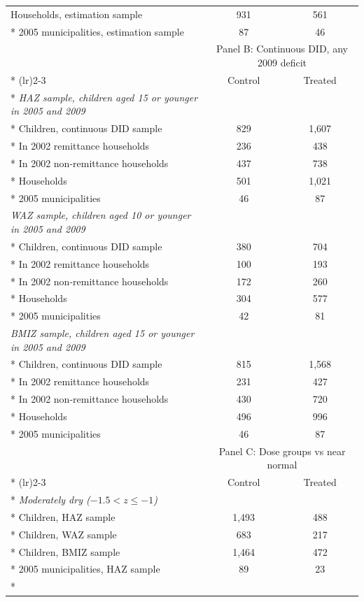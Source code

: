 \documentclass[12pt]{article}
\begin{document}
\begin{longtable}{@{\extracolsep{\fill}}lcc}
Households, estimation sample & 931 & 561\\*
2005 municipalities, estimation sample & 87 & 46\\
\bottomrule
\addlinespace[12pt]
\toprule
 & \multicolumn{2}{c}{Panel B: Continuous DID, any 2009 deficit}\\*
\cmidrule(lr){2-3}
 & Control & Treated\\*
\midrule
\textit{HAZ sample, children aged 15 or younger in 2005 and 2009} & & \\*
Children, continuous DID sample & 829 & 1,607\\*
\quad In 2002 remittance households & 236 & 438\\*
\quad In 2002 non-remittance households & 437 & 738\\*
Households & 501 & 1,021\\*
2005 municipalities & 46 & 87\\
\addlinespace[6pt]\textit{WAZ sample, children aged 10 or younger in 2005 and 2009} & & \\*
Children, continuous DID sample & 380 & 704\\*
\quad In 2002 remittance households & 100 & 193\\*
\quad In 2002 non-remittance households & 172 & 260\\*
Households & 304 & 577\\*
2005 municipalities & 42 & 81\\
\addlinespace[6pt]\textit{BMIZ sample, children aged 15 or younger in 2005 and 2009} & & \\*
Children, continuous DID sample & 815 & 1,568\\*
\quad In 2002 remittance households & 231 & 427\\*
\quad In 2002 non-remittance households & 430 & 720\\*
Households & 496 & 996\\*
2005 municipalities & 46 & 87\\
\bottomrule
\newpage
\toprule
 & \multicolumn{2}{c}{Panel C: Dose groups vs near normal}\\*
\cmidrule(lr){2-3}
 & Control & Treated\\*
\midrule
\textit{Moderately dry (\ensuremath{-1.5<z\le -1})} & & \\*
Children, HAZ sample & 1,493 & 488\\*
Children, WAZ sample & 683 & 217\\*
Children, BMIZ sample & 1,464 & 472\\*
2005 municipalities, HAZ sample & 89 & 23\\*

\end{longtable}
\end{document}

